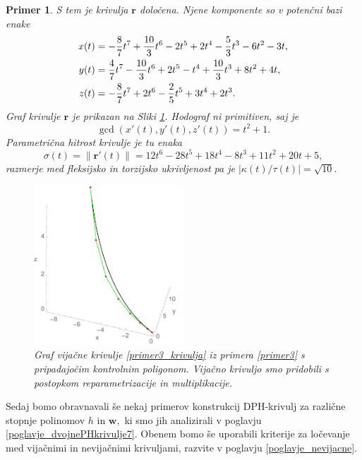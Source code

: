 \documentclass[12pt,a4paper,twoside]{article}
\theoremstyle{definition} %
\theoremstyle{plain} %
\theoremstyle{primerstyle}
\newtheorem{primer}[definicija]{Primer}
\numberwithin{equation}{section}  %
\newcommand{\rV}{\mathbf{r}}
\newcommand{\wV}{\mathbf{w}}
\begin{document}
\begin{primer}
	S tem je krivulja $\rV$ določena. Njene komponente so v potenčni bazi enake
	\begin{align}
		x(t)&=-\frac{8}{7}t^7+\frac{10}{3}t^6-2t^5+2t^4-\frac{5}{3}t^3-6t^2-3t,\notag\\
		y(t)&=\frac{4}{7}t^7-\frac{10}{3}t^6+2t^5-t^4+\frac{10}{3}t^3+8t^2+4t,\label{primer3_krivulja}\\
		z(t)&=-\frac{8}{7}t^7+2t^6-\frac{2}{5}t^5+3t^4+2t^3.\notag
	\end{align}
	Graf krivulje $\rV$ je prikazan na Sliki \ref{fig:reparametrization_multi}.
	Hodograf ni primitiven, saj je $$\gcd(x'(t),y'(t),z'(t))=t^2+1.$$ Parametrična hitrost krivulje je tu enaka
	\begin{equation*}
		\sigma(t)=\lVert\rV'(t)\rVert=12t^6-28t^5+18t^4-8t^3+11t^2+20t+5,
	\end{equation*}
	razmerje med fleksijsko in torzijsko ukrivljenost pa je $|\kappa(t)/\tau(t)|=\sqrt{10}.$
	\begin{figure}[h!]
	  \centering
	  \includegraphics[width=0.5\textwidth]{images/reparametrization_multi.pdf}
	  \caption[Primer vijačne krivulje, pridobljene s postopkom reparametrizacije in multiplikacije]{Graf vijačne krivulje \eqref{primer3_krivulja} iz primera \ref{primer3} s pripadajočim kontrolnim poligonom. Vijačno krivuljo smo pridobili s postopkom reparametrizacije in multiplikacije.}
	  \label{fig:reparametrization_multi}
	\end{figure}
\end{primer}

Sedaj bomo obravnavali še nekaj primerov konstrukcij DPH-krivulj za različne stopnje polinomov $h$ in $\wV,$ ki smo jih analizirali v poglavju \ref{poglavje_dvojnePHkrivulje7}. Obenem bomo še uporabili kriterije za ločevanje med vijačnimi in nevijačnimi krivuljami, razvite v poglavju \ref{poglavje_nevijacne}.
\end{document}
